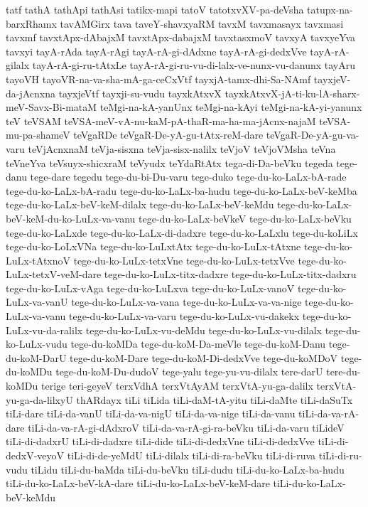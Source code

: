 {tatf
tathA
tathApi
tathAsi
tatikx-mapi
tatoV
tatotxvXV-pa-deVsha
tatupx-na-barxRhamx
tavAMGirx
tava
taveY-shavxyaRM
tavxM
tavxmasayx
tavxmasi
tavxmf
tavxtApx-dAbajxM
tavxtApx-dabajxM
tavxtasxmoV
tavxyA
tavxyeYva
tavxyi
tayA-rAda
tayA-rAgi
tayA-rA-gi-dAdxne
tayA-rA-gi-dedxVve
tayA-rA-gilalx
tayA-rA-gi-ru-tAtxLe
tayA-rA-gi-ru-vu-di-lalx-ve-nunx-vu-danunx
tayAru
tayoVH
tayoVR-na-va-sha-mA-ga-ceCxVtf
tayxjA-tamx-dhi-Sa-NAmf
tayxjeV-da-jAcnxna
tayxjeVtf
tayxji-su-vudu
tayxkAtxvX
tayxkAtxvX-jA-ti-ku-lA-sharx-meV-Savx-Bi-mataM
teMgi-na-kA-yanUnx
teMgi-na-kAyi
teMgi-na-kA-yi-yanunx
teV
teVSAM
teVSA-meV-vA-nu-kaM-pA-thaR-ma-ha-ma-jAcnx-najaM
teVSA-mu-pa-shameV
teVgaRDe
teVgaR-De-yA-gu-tAtx-reM-dare
teVgaR-De-yA-gu-va-varu
teVjAcnxnaM
teVja-sisxna
teVja-sisx-nalilx
teVjoV
teVjoVMsha
teVna
teVneYva
teVsuyx-shicxraM
teVyudx
teYdaRtAtx
tega-di-Da-beVku
tegeda
tege-danu
tege-dare
tegedu
tege-du-bi-Du-varu
tege-duko
tege-du-ko-LaLx-bA-rade
tege-du-ko-LaLx-bA-radu
tege-du-ko-LaLx-ba-hudu
tege-du-ko-LaLx-beV-keMba
tege-du-ko-LaLx-beV-keM-dilalx
tege-du-ko-LaLx-beV-keMdu
tege-du-ko-LaLx-beV-keM-du-ko-LuLx-va-vanu
tege-du-ko-LaLx-beVkeV
tege-du-ko-LaLx-beVku
tege-du-ko-LaLxde
tege-du-ko-LaLx-di-dadxre
tege-du-ko-LaLxlu
tege-du-koLiLx
tege-du-ko-LoLxVNa
tege-du-ko-LuLxtAtx
tege-du-ko-LuLx-tAtxne
tege-du-ko-LuLx-tAtxnoV
tege-du-ko-LuLx-tetxVne
tege-du-ko-LuLx-tetxVve
tege-du-ko-LuLx-tetxV-veM-dare
tege-du-ko-LuLx-titx-dadxre
tege-du-ko-LuLx-titx-dadxru
tege-du-ko-LuLx-vAga
tege-du-ko-LuLxva
tege-du-ko-LuLx-vanoV
tege-du-ko-LuLx-va-vanU
tege-du-ko-LuLx-va-vana
tege-du-ko-LuLx-va-va-nige
tege-du-ko-LuLx-va-vanu
tege-du-ko-LuLx-va-varu
tege-du-ko-LuLx-vu-dakekx
tege-du-ko-LuLx-vu-da-ralilx
tege-du-ko-LuLx-vu-deMdu
tege-du-ko-LuLx-vu-dilalx
tege-du-ko-LuLx-vudu
tege-du-koMDa
tege-du-koM-Da-meVle
tege-du-koM-Danu
tege-du-koM-DarU
tege-du-koM-Dare
tege-du-koM-Di-dedxVve
tege-du-koMDoV
tege-du-koMDu
tege-du-koM-Du-dudoV
tege-yalu
tege-yu-vu-dilalx
tere-darU
tere-du-koMDu
terige
teri-geyeV
terxVdhA
terxVtAyAM
terxVtA-yu-ga-dalilx
terxVtA-yu-ga-da-lilxyU
thARdayx
tiLi
tiLida
tiLi-daM-tA-yitu
tiLi-daMte
tiLi-daSuTx
tiLi-dare
tiLi-da-vanU
tiLi-da-va-nigU
tiLi-da-va-nige
tiLi-da-vanu
tiLi-da-va-rA-dare
tiLi-da-va-rA-gi-dAdxroV
tiLi-da-va-rA-gi-ra-beVku
tiLi-da-varu
tiLideV
tiLi-di-dadxrU
tiLi-di-dadxre
tiLi-dide
tiLi-di-dedxVne
tiLi-di-dedxVve
tiLi-di-dedxV-veyoV
tiLi-di-de-yeMdU
tiLi-dilalx
tiLi-di-ra-beVku
tiLi-di-ruva
tiLi-di-ru-vudu
tiLidu
tiLi-du-baMda
tiLi-du-beVku
tiLi-dudu
tiLi-du-ko-LaLx-ba-hudu
tiLi-du-ko-LaLx-beV-kA-dare
tiLi-du-ko-LaLx-beV-keM-dare
tiLi-du-ko-LaLx-beV-keMdu
}
